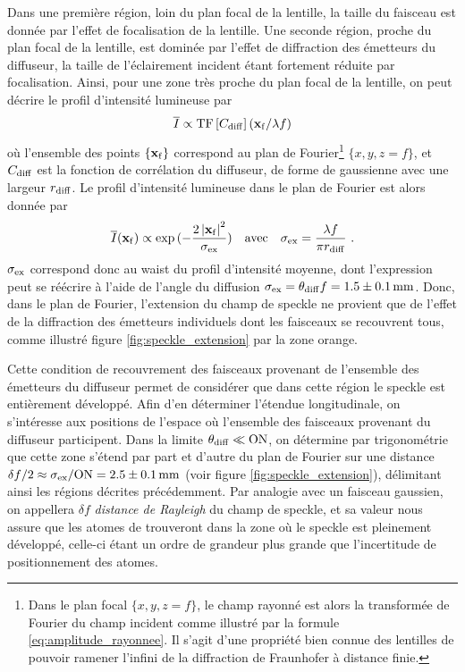 Dans une première région, loin du plan focal de la lentille, la taille du faisceau est donnée par l'effet de focalisation de la lentille. Une seconde région, proche du plan focal de la lentille, est dominée par l'effet de diffraction des émetteurs du diffuseur, la taille de l'éclairement incident étant fortement réduite par focalisation. Ainsi, pour une zone très proche du plan focal de la lentille, on peut décrire le profil d'intensité lumineuse par 
\begin{equation}
\overline{I}\propto \mathrm{TF} \left[ C_{\mathrm{diff}} \right] (\mathbf{x}_{\mathrm{f}}/\lambda f)
\end{equation}
où l'ensemble des points $\lbrace \mathbf{x}_{\mathrm{f}} \rbrace$ correspond au plan de Fourier\footnote{Dans le plan focal $\lbrace x,y,z=f\rbrace$, le champ rayonné est alors la transformée de Fourier du champ incident comme illustré par la formule \ref{eq:amplitude_rayonnee}. Il s'agit d'une propriété bien connue des lentilles de pouvoir ramener l'infini de la diffraction de Fraunhofer à distance finie.} $\lbrace x,y,z=f \rbrace$, et $C_{\mathrm{diff}}$ est la fonction de corrélation du diffuseur, de forme de gaussienne avec une largeur $r_{\mathrm{diff}}$. Le profil d'intensité lumineuse dans le plan de Fourier est alors donnée par 
\begin{equation}
\overline{I}(\mathbf{x}_{\mathrm{f}})\propto \exp{(-\frac{2 \left| \mathbf{x}_{\mathrm{f}}\right|^2}{\sigma_{\mathrm{ex}}})} \quad \text{avec} \quad \sigma_{\mathrm{ex}} = \frac{\lambda f}{\pi r_{\mathrm{diff}}} \text{ .}
\label{eq:intensite_moyenne_speckle}
\end{equation}
$\sigma_{\mathrm{ex}}$ correspond donc au waist du profil d'intensité moyenne, dont l'expression peut se réécrire à l'aide de l'angle du diffusion $\sigma_{\mathrm{ex}}=\theta_{\mathrm{diff}} f = 1.5\pm\SI{0.1}{\milli\metre}$. Donc, dans le plan de Fourier, l'extension du champ de speckle ne provient que de l'effet de la diffraction des émetteurs individuels dont les faisceaux se recouvrent tous, comme illustré figure \ref{fig:speckle_extension} par la zone orange.

Cette condition de recouvrement des faisceaux provenant de l'ensemble des émetteurs du diffuseur permet de considérer que dans cette région le speckle est entièrement développé. Afin d'en déterminer l'étendue longitudinale, on s'intéresse aux positions de l'espace où l'ensemble des faisceaux provenant du diffuseur participent. Dans la limite $\theta_{\mathrm{diff}} \ll \mathrm{ON}$, on détermine par trigonométrie que cette zone s'étend par part et d'autre du plan de Fourier sur une distance $\delta f/2\approx \sigma_{\mathrm{ex}} /\mathrm{ON} =2.5\pm\SI{0.1}{\milli\metre}$ (voir figure \ref{fig:speckle_extension}), délimitant ainsi les régions décrites précédemment. Par analogie avec un faisceau gaussien, on appellera $\delta f$ \emph{distance de Rayleigh} du champ de speckle, et sa valeur nous assure que les atomes de trouveront dans la zone où le speckle est pleinement développé, celle-ci étant un ordre de grandeur plus grande que l'incertitude de positionnement des atomes.















